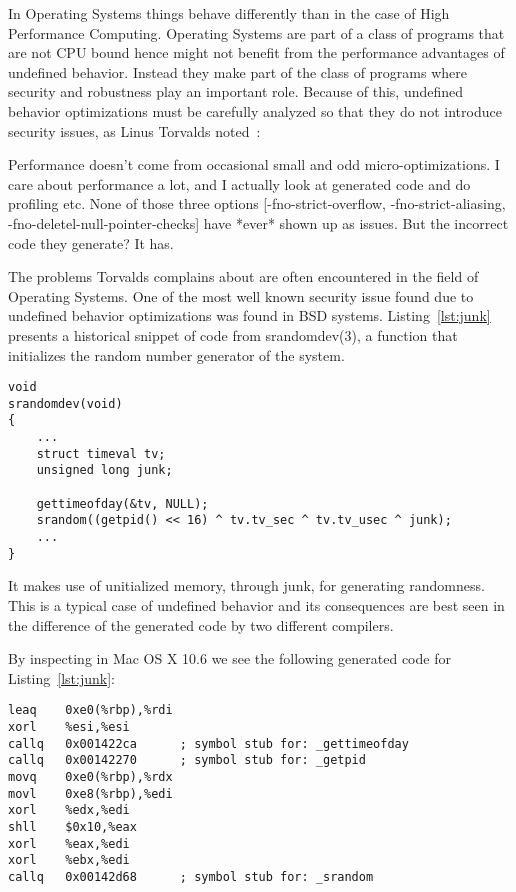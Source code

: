 In Operating Systems things behave differently than in the case of High
Performance Computing. Operating Systems are part of a class of programs
that are not CPU bound hence might not benefit from the performance
advantages of undefined behavior. Instead they make part of the class of
programs where security and robustness play an important role. Because
of this, undefined behavior optimizations must be carefully analyzed so
that they do not introduce security issues, as Linus Torvalds
noted~\cite{linusgcc}:
\begin{displayquote}
Performance doesn't come from occasional small and odd
micro-optimizations. I care about performance a lot, and I actually look
at generated code and do profiling etc. None of those three options
[-fno-strict-overflow, -fno-strict-aliasing,
-fno-deletel-null-pointer-checks] have *ever* shown up as issues. But
the incorrect code they generate? It has.
\end{displayquote}

The problems Torvalds complains about are often encountered in the field
of Operating Systems. One of the most well known security issue found
due to undefined behavior optimizations was found in BSD systems.
Listing~\ref{lst:junk} presents a historical snippet of code from
srandomdev(3), a function that initializes the random number generator
of the system.

\begin{lstlisting}[style=Cstyle, caption={srandom function in
lib/libc/stdlib/random.c on BSD systems}, label={lst:junk}]
void
srandomdev(void)
{
	...
	struct timeval tv;
	unsigned long junk;

	gettimeofday(&tv, NULL);
	srandom((getpid() << 16) ^ tv.tv_sec ^ tv.tv_usec ^ junk);
	...
}
\end{lstlisting}

It makes use of unitialized memory, through junk, for generating
randomness. This is a typical case of undefined behavior and its
consequences are best seen in the difference of the generated code by
two different compilers.

By inspecting  in Mac OS X 10.6 we see
the following generated code for Listing~\ref{lst:junk}:
\begin{lstlisting}[style=Cstyle, caption={}, label={}]
leaq    0xe0(%rbp),%rdi
xorl    %esi,%esi
callq   0x001422ca      ; symbol stub for: _gettimeofday
callq   0x00142270      ; symbol stub for: _getpid
movq    0xe0(%rbp),%rdx
movl    0xe8(%rbp),%edi
xorl    %edx,%edi
shll    $0x10,%eax
xorl    %eax,%edi
xorl    %ebx,%edi
callq   0x00142d68      ; symbol stub for: _srandom
\end{lstlisting}

